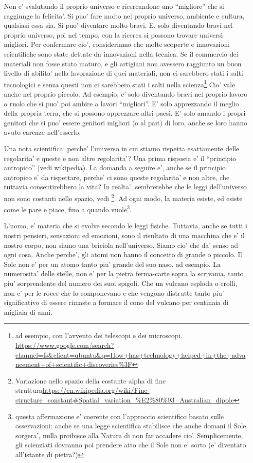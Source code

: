 Non e' svalutando il proprio universo e ricercandone uno ``migliore'' che si raggiunge la felicita'. Si puo' fare molto nel proprio universo, ambiente e cultura, qualsiasi essa sia. Si puo' diventare molto bravi. E, solo diventando bravi nel proprio universo, poi nel tempo, con la ricerca si possono trovare universi migliori.
Per confermare cio', consideriamo che molte scoperte e innovazioni scientifiche sono state dettate da innovazioni nella tecnica. Se il commercio dei materiali non fosse stato maturo, e gli artigiani non avessero raggiunto un buon livello di abilita' nella lavorazione di quei materiali, non ci sarebbero stati i salti tecnologici e senza questi non ci sarebbero stati i salti nella scienza\footnote{ad esempio, con l'avvento dei telescopi e dei microscopi. \url{https://www.google.com/search?channel=fs&client=ubuntu\&q=How+has+technology+helped+in+the+advancement+of+scientific+discoveries\%3F}}
Cio' vale anche nel proprio piccolo. Ad esempio, e' solo diventando bravi nel proprio lavoro o ruolo che si puo' poi ambire a lavori ``migliori''. E' solo apprezzando il meglio della propria terra, che si possono apprezzare altri paesi. E' solo amando i propri genitori che si puo' essere genitori migliori (o al pari) di loro, anche se loro hanno avuto carenze nell'esserlo.

Una nota scientifica: perche' l'universo in cui stiamo rispetta esattamente delle regolarita' e queste e non altre regolarita'? Una prima risposta e' il ``principio antropico'' (vedi wikipedia). La domanda a seguire e', anche se il principio antropico e' da rispettare, perche' ci sono queste regolarita' e non altre, che tuttavia consentirebbero la vita? In realta', sembrerebbe che le leggi dell'universo non sono costanti nello spazio, vedi \footnote{Variazione nello spazio della costante alpha di fine struttura\url{https://en.wikipedia.org/wiki/Fine-structure\_constant\#Spatial\_variation\_\%E2\%80\%93\_Australian\_dipole}}. Ad ogni modo, la materia esiste, ed esiste come le pare e piace, fino a quando vuole\footnote{questa affermazione e' coerente con l'approccio scientifico basato sulle osservazioni: anche se una legge scientifica stabilisce che anche domani il Sole sorgera', nulla proibisce alla Natura di non far accadere cio'. Semplicemente, gli scienziati dovranno poi prendere atto che il Sole non e' sorto (e' diventato all'istante di pietra?)}.

L'uomo, e' materia che si evolve secondo le leggi fisiche. Tuttavia, anche se tutti i nostri pensieri, sensazioni ed emozioni, sono il risultato di una macchina che e' il nostro corpo, non siamo una briciola nell'universo. Siamo cio' che da' senso ad ogni cosa. Anche perche', gli atomi non hanno il concetto di grande o piccolo. Il Sole non e' per un atomo tanto piu' grande del suo naso, ad esempio. La numerosita' delle stelle, non e' per la pietra ferma-carte sopra la scrivania, tanto piu' sorprendente del numero dei suoi spigoli. Che un vulcano esploda o crolli, non e' per le rocce che lo componevano e che vengono distrutte tanto piu' significativo di essere rimaste a formare il cono del vulcano per centinaia di migliaia di anni.

